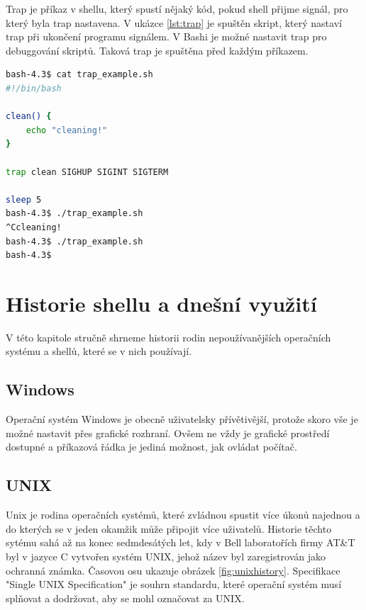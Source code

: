 \documentclass[thesis=M,czech]{FITthesis}[2012/06/26]
\begin{document}

Trap je příkaz v shellu, který spustí nějaký kód, pokud shell přijme signál, pro který byla trap nastavena. V ukázce \ref{lst:trap} je spuštěn skript, který nastaví trap při ukončení programu signálem. V Bashi je možné nastavit trap pro debuggování skriptů. Taková trap je spuštěna před každým příkazem.

\begin{minipage}{\linewidth}
\begin{lstlisting}[language=bash, caption={Ukázka trap v shellu Bash}, label={lst:trap}]
bash-4.3$ cat trap_example.sh
#!/bin/bash

clean() {
	echo "cleaning!"
}

trap clean SIGHUP SIGINT SIGTERM

sleep 5
bash-4.3$ ./trap_example.sh
^Ccleaning!
bash-4.3$ ./trap_example.sh
bash-4.3$
\end{lstlisting}
\end{minipage}

%
\chapter{Historie shellu a dnešní využití}

V této kapitole stručně shrneme historii rodin nepoužívanějších operačních systému a shellů, které se v nich používají.


%
\section{Windows}

Operační systém Windows je obecně uživatelsky přívětivější, protože skoro vše je možné nastavit přes grafické rozhraní. Ovšem ne vždy je grafické prostředí dostupné a příkazová řádka je jediná možnost, jak ovládat počítač.


\section{UNIX}

Unix je rodina operačních systémů, které zvládnou spustit více úkonů najednou a do kterých se v jeden okamžik může připojit více uživatelů. Historie těchto sytému sahá až na konec sedmdesátých let, kdy v Bell laboratořích firmy AT\&T byl v jazyce C vytvořen systém UNIX, jehož název byl zaregistrován jako ochranná známka. Časovou osu ukazuje obrázek \ref{fig:unixhistory}. Specifikace "Single UNIX Specification" je souhrn standardu, které operační systém musí splňovat a dodržovat, aby se mohl označovat za UNIX.
\end{document}
